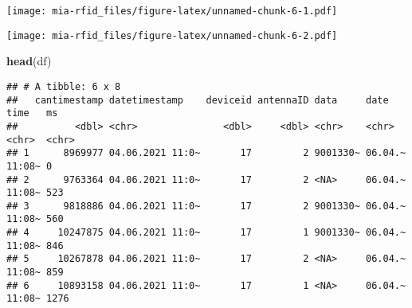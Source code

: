 \documentclass[
]{article}
\newenvironment{Shaded}{\begin{snugshade}}{\end{snugshade}}
\newcommand{\DataTypeTok}[1]{\textcolor[rgb]{0.13,0.29,0.53}{#1}}
\newcommand{\KeywordTok}[1]{\textcolor[rgb]{0.13,0.29,0.53}{\textbf{#1}}}
\newcommand{\NormalTok}[1]{#1}
\newcommand{\OperatorTok}[1]{\textcolor[rgb]{0.81,0.36,0.00}{\textbf{#1}}}
\newcommand{\StringTok}[1]{\textcolor[rgb]{0.31,0.60,0.02}{#1}}
\begin{document}
\texttt{[image: mia-rfid\_files/figure-latex/unnamed-chunk-6-1.pdf]}

\begin{Shaded}
\end{Shaded}

\texttt{[image: mia-rfid\_files/figure-latex/unnamed-chunk-6-2.pdf]}

\begin{Shaded}
\begin{Highlighting}[]
\KeywordTok{head}\NormalTok{(df)}
\end{Highlighting}
\end{Shaded}

\begin{verbatim}
## # A tibble: 6 x 8
##   cantimestamp datetimestamp    deviceid antennaID data     date    time   ms   
##          <dbl> <chr>               <dbl>     <dbl> <chr>    <chr>   <chr>  <chr>
## 1      8969977 04.06.2021 11:0~       17         2 9001330~ 06.04.~ 11:08~ 0    
## 2      9763364 04.06.2021 11:0~       17         2 <NA>     06.04.~ 11:08~ 523  
## 3      9818886 04.06.2021 11:0~       17         2 9001330~ 06.04.~ 11:08~ 560  
## 4     10247875 04.06.2021 11:0~       17         1 9001330~ 06.04.~ 11:08~ 846  
## 5     10267878 04.06.2021 11:0~       17         2 <NA>     06.04.~ 11:08~ 859  
## 6     10893158 04.06.2021 11:0~       17         1 <NA>     06.04.~ 11:08~ 1276
\end{verbatim}

\begin{Shaded}
\end{Shaded}
\end{document}
